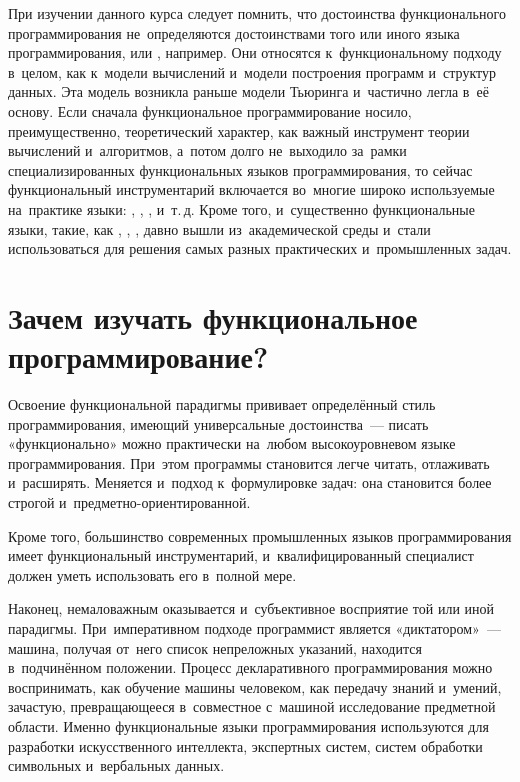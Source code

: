 При изучении данного курса следует помнить, что достоинства функционального программирования не~определяются достоинствами того или иного языка программирования,  или , например. Они относятся к~функциональному подходу в~целом, как к~модели вычислений и~модели построения программ и~структур данных. Эта модель возникла раньше модели Тьюринга и~частично легла в~её основу. Если сначала функциональное программирование носило, преимущественно, теоретический характер, как важный инструмент теории вычислений и~алгоритмов, а~потом долго не~выходило за~рамки специализированных функциональных языков программирования, то сейчас функциональный инструментарий включается во~многие широко используемые на~практике языки: , , ,  и~т.\,д. Кроме того, и~существенно функциональные языки, такие, как , \Lisp,  ,  давно вышли из~академической среды и~стали использоваться для решения самых разных практических и~промышленных задач.

\section[4]{Зачем изучать функциональное программирование?}%
Освоение функциональной парадигмы прививает определённый стиль программирования, имеющий универсальные достоинства~--- писать «функционально» можно практически на~любом высокоуровневом языке программирования. При~этом программы становится легче читать, отлаживать и~расширять. Меняется и~подход к~формулировке задач: она становится более строгой и~предметно-ориентированной.{\par}

Кроме того, большинство современных промышленных языков программирования имеет функциональный инструментарий, и~квалифицированный специалист должен уметь использовать его в~полной мере.

Наконец, немаловажным оказывается и~субъективное восприятие той или иной парадигмы. При~императивном подходе программист является «диктатором»~--- машина, получая от~него список непреложных указаний, находится в~подчинённом положении. Процесс декларативного программирования можно воспринимать, как обучение машины человеком, как передачу знаний и~умений, зачастую, превращающееся в~совместное с~машиной исследование предметной области. Именно функциональные языки программирования используются для разработки искусственного интеллекта, экспертных систем, систем обработки символьных и~вербальных данных.

